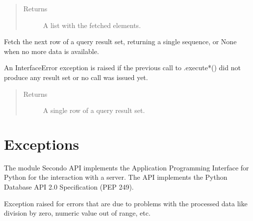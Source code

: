 \documentclass[letterpaper,10pt,english]{sphinxmanual}
\begin{document}
\begin{fulllineitems}
\begin{fulllineitems}
\begin{quote}
\begin{description}
\item[{Returns}] \leavevmode
A list with the fetched elements.

\end{description}\end{quote}

\end{fulllineitems}


\begin{fulllineitems}
\label{\detokenize{index:secondodb.api.secondoapi.Cursor.fetchone}}
Fetch the next row of a query result set, returning a single sequence, or None when no more data is available.

An InterfaceError exception is raised if the previous call to .execute*() did not produce any result set or
no call was issued yet.
\begin{quote}\begin{description}
\item[{Returns}] \leavevmode
A single row of a query result set.

\end{description}\end{quote}

\end{fulllineitems}


\end{fulllineitems}



\section{Exceptions}
\label{\detokenize{index:exceptions}}
The module Secondo API implements the Application Programming Interface for Python for the interaction with a 
server. The API implements the Python Database API 2.0 Specification (PEP 249).


\begin{fulllineitems}
Exception raised for errors that are due to problems with the processed data like division by zero,
numeric value out of range, etc.

\end{fulllineitems}
\end{document}

